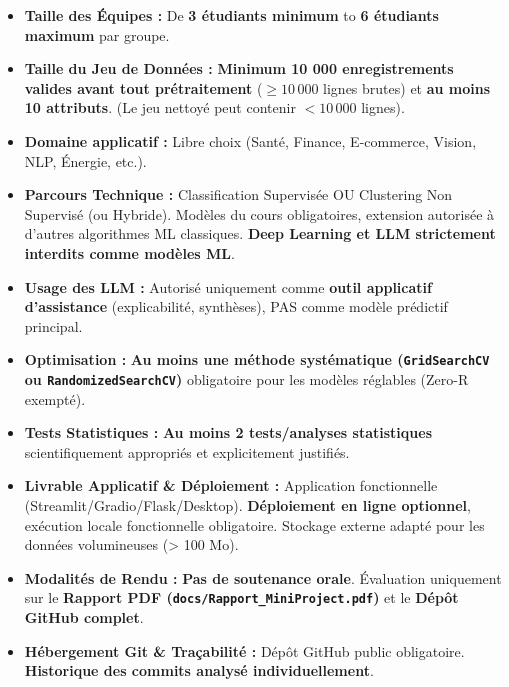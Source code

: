 \documentclass[11pt,a4paper]{article}
\begin{document}
\begin{tcolorbox}[colback=sintefgold!15, colframe=sintefgold!80!black, title=\textbf{EN BREF — RÈGLES ET MODALITÉS DU PROJET}, arc=2mm]
    \begin{itemize}[leftmargin=*]
        \item \textbf{Taille des Équipes :} De \textbf{3 étudiants minimum} to \textbf{6 étudiants maximum} par groupe.
        \item \textbf{Taille du Jeu de Données :} \textbf{Minimum 10 000 enregistrements valides avant tout prétraitement} ($\ge 10\,000$ lignes brutes) et \textbf{au moins 10 attributs}. (Le jeu nettoyé peut contenir $< 10\,000$ lignes).
        \item \textbf{Domaine applicatif :} Libre choix (Santé, Finance, E-commerce, Vision, NLP, Énergie, etc.).
        \item \textbf{Parcours Technique :} Classification Supervisée OU Clustering Non Supervisé (ou Hybride). Modèles du cours obligatoires, extension autorisée à d'autres algorithmes ML classiques. \textbf{Deep Learning et LLM strictement interdits comme modèles ML}.
        \item \textbf{Usage des LLM :} Autorisé uniquement comme \textbf{outil applicatif d'assistance} (explicabilité, synthèses), PAS comme modèle prédictif principal.
        \item \textbf{Optimisation :} \textbf{Au moins une méthode systématique (\texttt{GridSearchCV} ou \texttt{RandomizedSearchCV})} obligatoire pour les modèles réglables (Zero-R exempté).
        \item \textbf{Tests Statistiques :} \textbf{Au moins 2 tests/analyses statistiques} scientifiquement appropriés et explicitement justifiés.
        \item \textbf{Livrable Applicatif \& Déploiement :} Application fonctionnelle (Streamlit/Gradio/Flask/Desktop). \textbf{Déploiement en ligne optionnel}, exécution locale fonctionnelle obligatoire. Stockage externe adapté pour les données volumineuses (> 100 Mo).
        \item \textbf{Modalités de Rendu :} \textbf{Pas de soutenance orale}. Évaluation uniquement sur le \textbf{Rapport PDF (\texttt{docs/Rapport\_MiniProject.pdf})} et le \textbf{Dépôt GitHub complet}.
        \item \textbf{Hébergement Git \& Traçabilité :} Dépôt GitHub public obligatoire. \textbf{Historique des commits analysé individuellement}.
    \end{itemize}
\end{tcolorbox}
\end{document}
